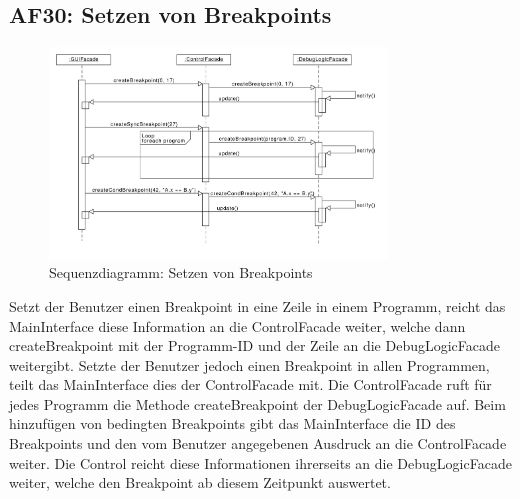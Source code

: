 \documentclass[parskip=full]{scrartcl}
\begin{document}
\subsection{AF30: Setzen von Breakpoints}
\begin{figure}[!h]
\centering
\includegraphics[width=0.8\textwidth]{diagrammIdeenUmlet/SequenceDiagrams/seq_breakpointsPDF.pdf}
\caption{Sequenzdiagramm: Setzen von Breakpoints}
\end{figure}
Setzt der Benutzer einen Breakpoint in eine Zeile in einem Programm, reicht das MainInterface
diese Information an die ControlFacade weiter, welche dann createBreakpoint mit der Programm-ID und der
Zeile an die DebugLogicFacade weitergibt.
Setzte der Benutzer jedoch einen Breakpoint in allen Programmen, teilt das
MainInterface dies der ControlFacade mit. Die ControlFacade ruft für jedes Programm
die Methode createBreakpoint der DebugLogicFacade auf.
Beim hinzufügen von bedingten Breakpoints gibt das MainInterface die ID des Breakpoints
und den vom Benutzer angegebenen Ausdruck an die ControlFacade weiter. Die Control reicht diese Informationen
ihrerseits an die DebugLogicFacade weiter, welche den Breakpoint ab diesem Zeitpunkt auswertet.

\newpage
\end{document}
